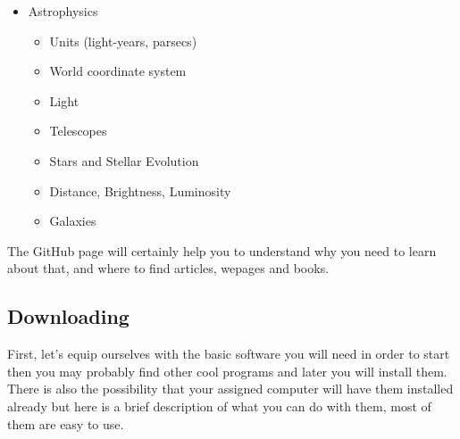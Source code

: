 \documentclass[11pt,fleqn]{book} %
\begin{document}
\begin{itemize}
    \item Astrophysics
    	\begin{itemize}
        	\item Units (light-years, parsecs)
            \item World coordinate system
        	\item Light
            \item Telescopes
            \item Stars and Stellar Evolution
            \item Distance, Brightness, Luminosity
            \item Galaxies
        \end{itemize}
\end{itemize}
The GitHub page will certainly help you to understand why you need to learn about that, and where to find articles, wepages and books.
\subsection{Downloading}
First, let's equip ourselves with the basic software you will need in order to start then you may probably find other cool programs and later you will install them. There is also the possibility that your assigned computer will have them installed already but here is a brief description of what you can do with them, most of them are easy to use.
\end{document}
